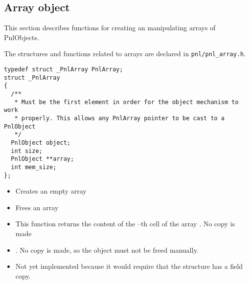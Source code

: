 \subsection{Array object}

This section describes functions for creating an manipulating arrays of
PnlObjects.

The structures and functions related to arrays are declared in
\verb!pnl/pnl_array.h!.

\begin{verbatim}
typedef struct _PnlArray PnlArray;
struct _PnlArray
{
  /**
   * Must be the first element in order for the object mechanism to work
   * properly. This allows any PnlArray pointer to be cast to a PnlObject
   */
  PnlObject object; 
  int size;
  PnlObject **array;
  int mem_size;
};
\end{verbatim}

\begin{itemize}
\item {}
  \sshortdescribe Creates an empty array
\item {}
  \sshortdescribe Frees an array
\item {}
  \sshortdescribe This function returns the content of the --th cell of
  the array . No copy is made
\item {}
  \sshortdescribe {}. No copy is made, so the object  must
  not be freed manually.
\item {}
  \sshortdescribe Not yet implemented because it would require that the
  structure  has a field copy.
\end{itemize}



